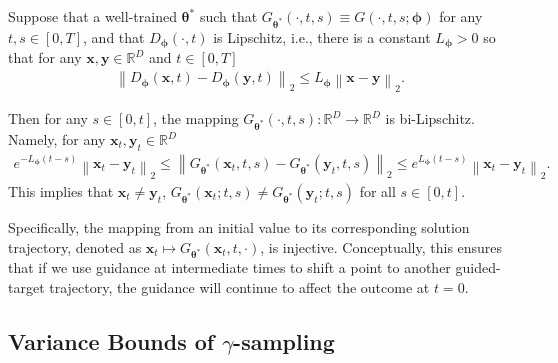 \documentclass{article} \usepackage{iclr2024_coNFErence,times}
\newcommand{\norm}[1]{\left\lVert#1\right\rVert}
\theoremstyle{definition}
\theoremstyle{remark}
\begin{document}
\begin{proposition}\label{th:gt_injective}
Suppose that a well-trained $\bm{\theta}^*$ such that $G_{\bm{\theta}^*}(\cdot,t,s)\equiv G(\cdot,t,s;\bm{\phi})$ for any $t, s\in[0,T]$, and that $D_{\bm{\phi}}(\cdot,t)$ is Lipschitz, i.e., there is a constant $L_{\bm{\phi}}>0$
so that for any $\mathbf{x},\mathbf{y}\in\mathbb{R}^D$ and $t\in[0,T]$
\begin{align*}
    \norm{D_{\bm{\phi}}(\mathbf{x},t) - D_{\bm{\phi}}(\mathbf{y},t)}_2 \leq L_{\bm{\phi}}\norm{\mathbf{x}-\mathbf{y}}_2.
\end{align*}

Then for any $s\in[0,t]$, the mapping $G_{\bm{\theta}^*}(\cdot,t,s)\colon\mathbb{R}^D\rightarrow\mathbb{R}^D$ is bi-Lipschitz. Namely, for any $\mathbf{x}_t, \mathbf{y}_t\in\mathbb{R}^D$
    \begin{align}
        e^{-L_{\bm{\phi}}(t-s)}\norm{\mathbf{x}_t- \mathbf{y}_t}_2\leq \norm{G_{\bm{\theta}^*}(\mathbf{x}_t,t,s) -G_{\bm{\theta}^*}(\mathbf{y}_t,t,s)}_2 \leq e^{L_{\bm{\phi}}(t-s)}\norm{\mathbf{x}_t- \mathbf{y}_t}_2.
    \end{align}
    This implies that $\mathbf{x}_t\neq\mathbf{y}_t$, $G_{\bm{\theta}^*}(\mathbf{x}_t; t, s)\neq G_{\bm{\theta}^*}(\mathbf{y}_t; t, s)$ for all $s\in[0,t]$. 
\end{proposition}

Specifically, the mapping from an initial value to its corresponding solution trajectory, denoted as $\mathbf{x}_t\mapsto G_{\bm{\theta}^*}(\mathbf{x}_t, t, \cdot)$, is injective. Conceptually, this ensures that if we use guidance at intermediate times to shift a point to another guided-target trajectory, the guidance will continue to affect the outcome at $t=0$.

\subsection{Variance Bounds of $\gamma$-sampling}\label{sec:var_bound}
\end{document}
